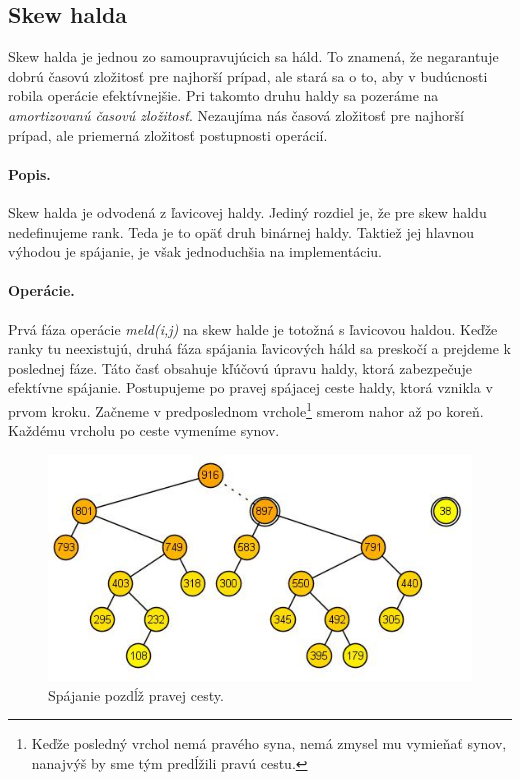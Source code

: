 \subsection{Skew halda} 
Skew halda je jednou zo samoupravujúcich sa háld. To znamená, že negarantuje dobrú časovú zložitosť pre najhorší prípad, ale stará 
sa o to, aby v budúcnosti robila operácie efektívnejšie. Pri takomto druhu haldy sa pozeráme na \emph{amortizovanú časovú 
zložitosť}. Nezaujíma nás časová zložitosť pre najhorší prípad, ale priemerná zložitosť postupnosti operácií.

\paragraph{Popis.}
Skew halda je odvodená z ľavicovej haldy. Jediný rozdiel je, že pre skew haldu nedefinujeme rank. Teda je to opäť druh binárnej 
haldy. Taktiež jej hlavnou výhodou je spájanie, je však jednoduchšia na implementáciu.


\paragraph{Operácie.}
Prvá fáza operácie \emph{meld(i,j)} na skew halde je totožná s ľavicovou haldou. Keďže ranky tu neexistujú, druhá fáza spájania 
ľavicových háld sa preskočí a prejdeme k poslednej fáze. Táto časť obsahuje kľúčovú úpravu haldy, ktorá zabezpečuje efektívne 
spájanie. Postupujeme po pravej spájacej ceste haldy, ktorá vznikla v prvom kroku. Začneme v predposlednom vrchole\footnote{Keďže posledný vrchol nemá pravého syna, nemá zmysel mu vymieňať synov, nanajvýš by sme tým predĺžili pravú cestu.} smerom nahor až po koreň. Každému vrcholu po ceste vymeníme synov.


\begin{figure}
\includegraphics[width=\columnwidth]{obrazky/skewinsert.png}
\caption{\emph{} 
Spájanie pozdĺž pravej cesty.} 
\label{img:skew} 
\end{figure}

